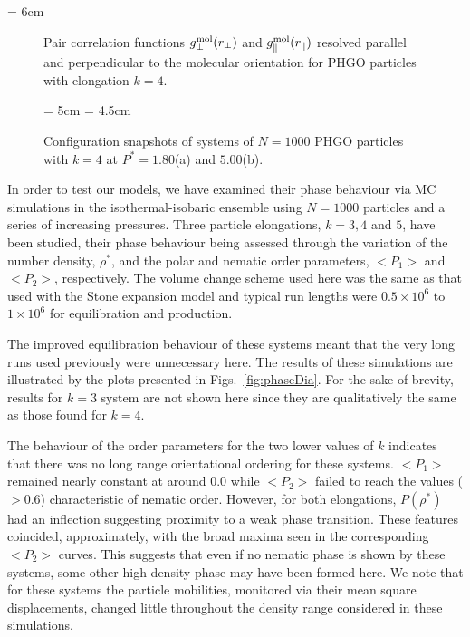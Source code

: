 \documentclass[%
reprint,
superscriptaddress,
showpacs,
 amsmath,amssymb,
 aps,
floatfix,
]{revtex4-1}
\newcommand{\pic}[1]{\texttt{[image: \#1]}}
\newcommand{\picL}[1]{\texttt{[image: \#1]}}
\newlength{\picW}
\begin{document}
\picW = 6cm
\begin{figure*}
    \centering
    \subfigure[$g_\parallel(r_\parallel)$]{\picL{GBP_grParallel_k4.ps}}
    \subfigure[$g_\perp(r_\perp)$]{\picL{GBP_grPerpLayer_k4.ps}}
    \caption{Pair correlation functions $g^{\rm mol}_\perp(r_\perp)$ and
    $g^{\rm mol}_\parallel(r_\parallel)$ resolved parallel and perpendicular to the molecular
    orientation for PHGO particles with elongation $k=4$.}
    \label{fig:PCF_GBP_k4}
\end{figure*}

\begin{figure*}
    \centering
\picW = 5cm
    \subfigure[isotropic]{\pic{GBP_box_k4_iso.ps}}
\picW = 4.5cm
    \subfigure[domain ordered]{\pic{GBP_box_k4_fun.ps}}
    \caption{Configuration snapshots of systems of $N=1000$ PHGO particles with $k=4$ at
    $P^{*}=1.80$(a) and $5.00$(b).}
    \label{fig:phaseSnaps_k4}
\end{figure*}


In order to test our models, we have examined their phase
behaviour via MC simulations in the isothermal-isobaric ensemble
using $N=1000$ particles and a series of increasing pressures.
Three particle elongations, $k=3,4$ and $5$, have been studied,
their phase behaviour being assessed through the variation of the
number density, $\rho^{*}$, and the polar and nematic order
parameters, $<P_1>$ and $<P_2>$, respectively.
The volume
change scheme used here was the same as that used with the Stone
expansion model and
typical run lengths were $0.5\times 10^6$ to $1\times 10^6$ for
equilibration and production.



The improved equilibration behaviour of these
systems meant that the very long runs used previously were
unnecessary here. The results of these simulations are illustrated
by the plots presented in Figs.~\ref{fig:phaseDia}. For the sake
of brevity, results for $k=3$ system are not shown here since they
are qualitatively the same as those found for $k=4$.


The behaviour of the order parameters for the two lower values of $k$ indicates that there was
no long range orientational ordering for these systems. $<P_1>$ remained nearly constant at around
$0.0$ while $<P_2>$ failed to reach the values ($>0.6$) characteristic of nematic order. However,
for both elongations, $P(\rho^{*})$ had an inflection suggesting proximity to a weak phase
transition. These features coincided, approximately, with the broad maxima seen in the
corresponding $<P_2>$ curves. This suggests that even if no nematic phase is shown by these
systems, some other high density phase may have been formed here. We note that for these systems
the particle mobilities, monitored via their mean square displacements, changed little
throughout the density range considered in these simulations.
\end{document}
